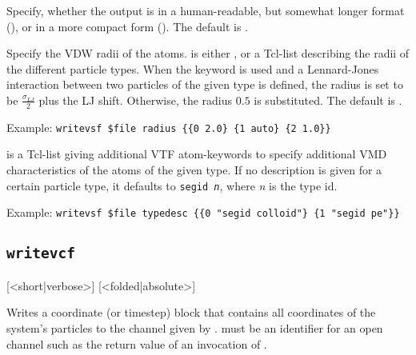\begin{arguments}
\item[\opt{<short|verbose>}]
  Specify, whether the output is in a human-readable, but somewhat
  longer format (), or in a more compact form
  (). The default is .
  
\item[\opt{radius <\var{radii}|auto>}]
  Specify the VDW radii of the atoms.  is either
  , or a Tcl-list describing the radii of the different
  particle types. When the keyword  is used and a
  Lennard-Jones interaction between two particles of the given type is
  defined, the radius is set to be $\frac{\sigma_{LJ}}{2}$ plus the LJ
  shift.  Otherwise, the radius $0.5$ is substituted. The default is
  .
  
  Example: \verb!writevsf $file radius {{0 2.0} {1 auto} {2 1.0}}!
  
\item[\opt{typedesc \var{typedesc}}]
   is a Tcl-list giving additional VTF atom-keywords to
  specify additional VMD characteristics of the atoms of the given type.
  If no description is given for a certain particle type, it defaults to
  \texttt{segid \textit{n}}, where \textit{n} is the type id.
  
  Example: \verb!writevsf $file typedesc {{0 "segid colloid"} {1 "segid pe"}}!
\end{arguments}


\subsection{\texttt{writevcf}}
{ [<short|verbose>] [<folded|absolute>]}

Writes a coordinate (or timestep) block that contains all coordinates
of the system's particles to the channel given by .
 must be an identifier for an open channel such as the
return value of an invocation of .

